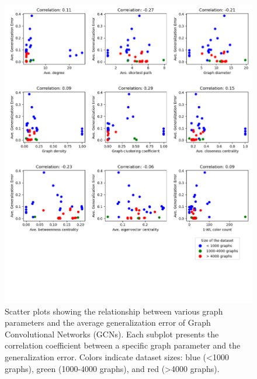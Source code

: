 \begin{figure}[H]
    \centering
    \includegraphics[width=\textwidth]{images/correlation_GCN.png}
    \caption{Scatter plots showing the relationship between various graph parameters and the average generalization error of Graph Convolutional Networks (GCNs). Each subplot presents the correlation coefficient between a specific graph parameter and the generalization error. Colors indicate dataset sizes: blue (<1000 graphs), green (1000-4000 graphs), and red (>4000 graphs).}
    \label{fig:correlation_GCN}
\end{figure}

